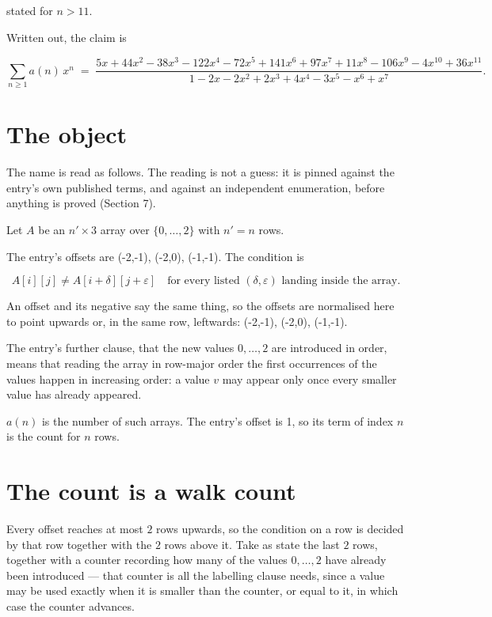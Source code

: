 \documentclass[11pt]{article}
\theoremstyle{definition}
\begin{document}
stated for $n > 11$.

Written out, the claim is

\[\sum_{n \ge 1} a(n)\,x^n \;=\; \frac{5x + 44x^{2} - 38x^{3} - 122x^{4} - 72x^{5} + 141x^{6} + 97x^{7} + 11x^{8} - 106x^{9} - 4x^{10} + 36x^{11}}{1 - 2x - 2x^{2} + 2x^{3} + 4x^{4} - 3x^{5} - x^{6} + x^{7}}.\]

\section{The object}

The name is read as follows. The reading is not a guess: it is pinned against the entry's own published terms, and against an independent enumeration, before anything is proved (Section 7).

Let $A$ be an $n' \times 3$ array over $\{0,\dots,2\}$ with $n' = n$ rows.

The entry's offsets are (-2,-1), (-2,0), (-1,-1). The condition is

\[A[i][j] \ne A[i{+}\delta][j{+}\varepsilon]\quad\text{for every listed }(\delta,\varepsilon)\text{ landing inside the array.}\]

An offset and its negative say the same thing, so the offsets are normalised here to point upwards or, in the same row, leftwards: (-2,-1), (-2,0), (-1,-1).

The entry's further clause, that the new values $0,\dots,2$ are introduced in order, means that reading the array in row-major order the first occurrences of the values happen in increasing order: a value $v$ may appear only once every smaller value has already appeared.

$a(n)$ is the number of such arrays. The entry's offset is 1, so its term of index $n$ is the count for $n$ rows.

\section{The count is a walk count}

Every offset reaches at most $2$ rows upwards, so the condition on a row is decided by that row together with the $2$ rows above it. Take as state the last $2$ rows, together with a counter recording how many of the values $0,\dots,2$ have already been introduced --- that counter is all the labelling clause needs, since a value may be used exactly when it is smaller than the counter, or equal to it, in which case the counter advances.
\end{document}
